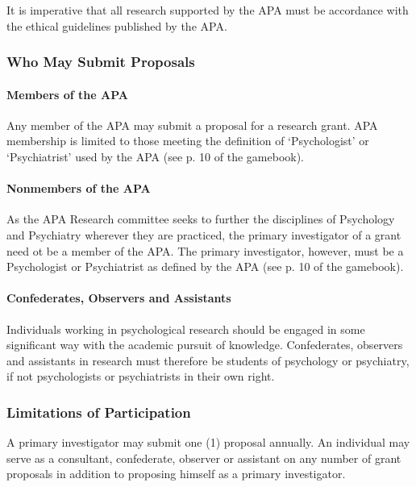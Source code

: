 {{It is imperative that all research supported by the APA must be accordance with the ethical guidelines published by the APA. 

\subsubsection{Who May Submit Proposals}
\label{whomaysubmitproposals}

\paragraph{Members of the APA}
\label{membersoftheapa}

Any member of the APA may submit a proposal for a research grant. APA membership is limited to those meeting the definition of `Psychologist' or `Psychiatrist' used by the APA (see p. 10 of the gamebook).

\paragraph{Nonmembers of the APA}
\label{nonmembersoftheapa}

As the APA Research committee seeks to further the disciplines of Psychology and Psychiatry wherever they are practiced, the primary investigator of a grant need ot be a member of the APA. The primary investigator, however, must be a Psychologist or Psychiatrist as defined by the APA (see p. 10 of the gamebook).

\paragraph{Confederates, Observers and Assistants}
\label{confederatesobserversandassistants}

Individuals working in psychological research should be engaged in some significant way with the academic pursuit of knowledge. Confederates, observers and assistants in research must therefore be students of psychology or psychiatry, if not psychologists or psychiatrists in their own right.

\subsubsection{Limitations of Participation}
\label{limitationsofparticipation}

A primary investigator may submit one (1) proposal annually. An individual may serve as a consultant, confederate, observer or assistant on any number of grant proposals in addition to proposing himself as a primary investigator. 

}}
